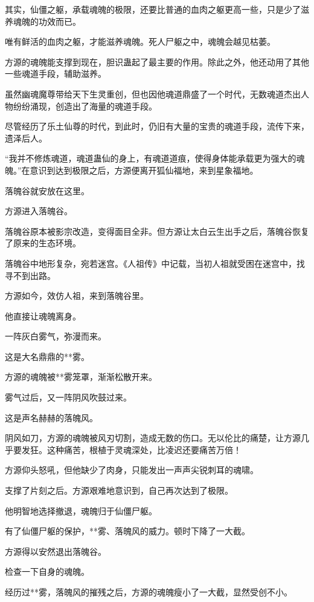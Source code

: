 
\begin{this_body}

其实，仙僵之躯，承载魂魄的极限，还要比普通的血肉之躯更高一些，只是少了滋养魂魄的功效而已。

唯有鲜活的血肉之躯，才能滋养魂魄。死人尸躯之中，魂魄会越见枯萎。

方源的魂魄能支撑到现在，胆识蛊起了最主要的作用。除此之外，他还动用了其他一些魂道手段，辅助滋养。

虽然幽魂魔尊带给天下生灵重创，但也因他魂道鼎盛了一个时代，无数魂道杰出人物纷纷涌现，创造出了海量的魂道手段。

尽管经历了乐土仙尊的时代，到此时，仍旧有大量的宝贵的魂道手段，流传下来，遗泽后人。

“我并不修炼魂道，魂道蛊仙的身上，有魂道道痕，使得身体能承载更为强大的魂魄。”在意识到达到极限之后，方源便离开狐仙福地，来到星象福地。

落魄谷就安放在这里。

方源进入落魄谷。

落魄谷原本被影宗改造，变得面目全非。但方源让太白云生出手之后，落魄谷恢复了原来的生态环境。

落魄谷中地形复杂，宛若迷宫。《人祖传》中记载，当初人祖就受困在迷宫中，找寻不到出路。

方源如今，效仿人祖，来到落魄谷里。

他直接让魂魄离身。

一阵灰白雾气，弥漫而来。

这是大名鼎鼎的**雾。

方源的魂魄被**雾笼罩，渐渐松散开来。

雾气过后，又一阵阴风吹鼓过来。

这是声名赫赫的落魄风。

阴风如刀，方源的魂魄被风刃切割，造成无数的伤口。无以伦比的痛楚，让方源几乎要发狂。这种痛苦，根植于灵魂深处，比凌迟还要痛苦万倍！

方源仰头怒吼，但他缺少了肉身，只能发出一声声尖锐刺耳的魂啸。

支撑了片刻之后。方源艰难地意识到，自己再次达到了极限。

他明智地选择撤退，魂魄归于仙僵尸躯。

有了仙僵尸躯的保护，**雾、落魄风的威力。顿时下降了一大截。

方源得以安然退出落魄谷。

检查一下自身的魂魄。

经历过**雾，落魄风的摧残之后，方源的魂魄瘦小了一大截，显然受创不小。


\end{this_body}
